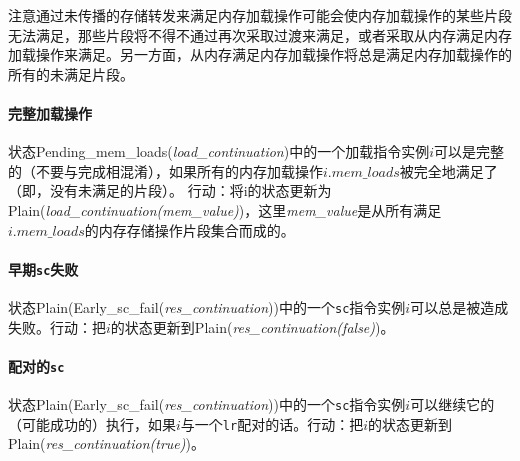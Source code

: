 \begin{commentary}
  注意通过未传播的存储转发来满足内存加载操作可能会使内存加载操作的某些片段无法满足，那些片段将不得不通过再次采取过渡来满足，或者采取从内存满足内存加载操作来满足。另一方面，从内存满足内存加载操作将总是满足内存加载操作的所有的未满足片段。
\end{commentary}


\paragraph{完整加载操作}\label{omm:complete_loads}
状态{\sc Pending\_mem\_loads}({\it load\_continuation})中的一个加载指令实例$i$可以是完整的（不要与完成相混淆），如果所有的内存加载操作$i.\textit{mem\_loads}$被完全地满足了（即，没有未满足的片段）。
行动：将i的状态更新为{\sc Plain}({\it load\_continuation(mem\_value)})，这里{\it mem\_value}是从所有满足$i.\textit{mem\_loads}$的内存存储操作片段集合而成的。


\paragraph{早期{\tt sc}失败}\label{omm:early_sc_fail}
状态{\sc Plain}({\sc Early\_sc\_fail}({\it res\_continuation}))中的一个{\tt sc}指令实例$i$可以总是被造成失败。行动：把$i$的状态更新到{\sc Plain}({\it res\_continuation(false)})。


\paragraph{配对的{\tt sc} }\label{omm:paired_sc}
状态{\sc Plain}({\sc Early\_sc\_fail}({\it res\_continuation}))中的一个{\tt sc}指令实例$i$可以继续它的（可能成功的）执行，如果$i$与一个{\tt lr}配对的话。行动：把$i$的状态更新到{\sc Plain}({\it res\_continuation(true)})。


